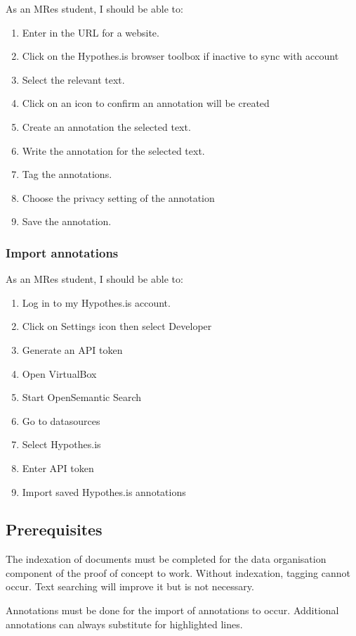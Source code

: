 \documentclass{article}
\begin{document}
As an MRes student, I should be able to:
\begin{enumerate}
\item Enter in the URL for a website. 
\item Click on the Hypothes.is browser toolbox if inactive to sync with account
\item Select the relevant text. 
\item Click on an icon to confirm an annotation will be created
\item Create an annotation the selected text.
\item Write the annotation for the selected text.
\item Tag the annotations. 
\item Choose the privacy setting of the annotation
\item Save the annotation. 
\end{enumerate}

\subsubsection*{Import annotations}
As an MRes student, I should be able to:
\begin{enumerate}
\item Log in to my Hypothes.is account.
\item Click on Settings icon then select Developer
\item Generate an API token
\item Open VirtualBox
\item Start OpenSemantic Search
\item Go to datasources
\item Select Hypothes.is
\item Enter API token
\item Import saved Hypothes.is annotations
\end{enumerate}

\subsection*{Prerequisites}

The indexation of documents must be completed for the data organisation component of the proof of concept to work. Without indexation, tagging cannot occur. Text searching will improve it but is not necessary.

Annotations must be done for the import of annotations to occur. Additional annotations can always substitute for highlighted lines.
\end{document}
